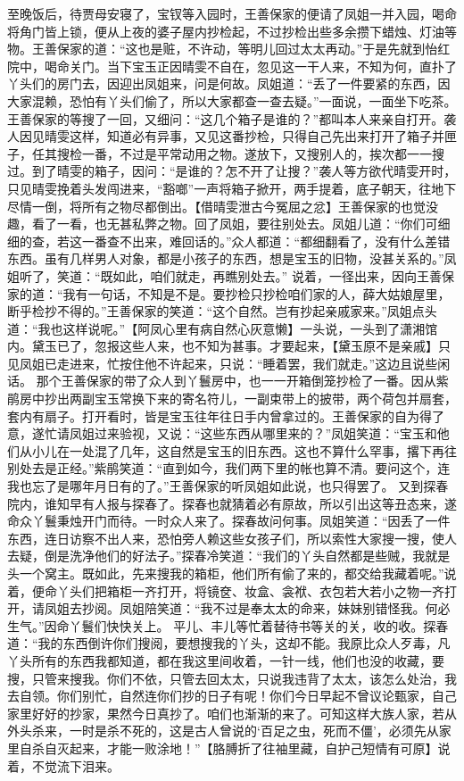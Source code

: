 \documentclass[12pt,oneside]{book}
\begin{document}
至晚饭后，待贾母安寝了，宝钗等入园时，王善保家的便请了凤姐一并入园，喝命将角门皆上锁，便从上夜的婆子屋内抄检起，不过抄检出些多余攒下蜡烛、灯油等物。王善保家的道：“这也是赃，不许动，等明儿回过太太再动。”于是先就到怡红院中，喝命关门。当下宝玉正因晴雯不自在，忽见这一干人来，不知为何，直扑了丫头们的房门去，因迎出凤姐来，问是何故。凤姐道：“丢了一件要紧的东西，因大家混赖，恐怕有丫头们偷了，所以大家都查一查去疑。”一面说，一面坐下吃茶。
王善保家的等搜了一回，又细问：“这几个箱子是谁的？”都叫本人来亲自打开。袭人因见晴雯这样，知道必有异事，又见这番抄检，只得自己先出来打开了箱子并匣子，任其搜检一番，不过是平常动用之物。遂放下，又搜别人的，挨次都一一搜过。到了晴雯的箱子，因问：“是谁的？怎不开了让搜？”袭人等方欲代晴雯开时，只见晴雯挽着头发闯进来，“豁啷”一声将箱子掀开，两手提着，底子朝天，往地下尽情一倒，将所有之物尽都倒出。【借晴雯泄古今冤屈之忿】王善保家的也觉没趣，看了一看，也无甚私弊之物。回了凤姐，要往别处去。凤姐儿道：“你们可细细的查，若这一番查不出来，难回话的。”众人都道：“都细翻看了，没有什么差错东西。虽有几样男人对象，都是小孩子的东西，想是宝玉的旧物，没甚关系的。”凤姐听了，笑道：“既如此，咱们就走，再瞧别处去。”
说着，一径出来，因向王善保家的道：“我有一句话，不知是不是。要抄检只抄检咱们家的人，薛大姑娘屋里，断乎检抄不得的。”王善保家的笑道：“这个自然。岂有抄起亲戚家来。”凤姐点头道：“我也这样说呢。”【阿凤心里有病自然心灰意懒】一头说，一头到了潇湘馆内。黛玉已了，忽报这些人来，也不知为甚事。才要起来，【黛玉原不是亲戚】只见凤姐已走进来，忙按住他不许起来，只说：“睡着罢，我们就走。”这边且说些闲话。
那个王善保家的带了众人到丫鬟房中，也一一开箱倒笼抄检了一番。因从紫鹃房中抄出两副宝玉常换下来的寄名符儿，一副束带上的披带，两个荷包并扇套，套内有扇子。打开看时，皆是宝玉往年往日手内曾拿过的。王善保家的自为得了意，遂忙请凤姐过来验视，又说：“这些东西从哪里来的？”凤姐笑道：“宝玉和他们从小儿在一处混了几年，这自然是宝玉的旧东西。这也不算什么罕事，撂下再往别处去是正经。”紫鹃笑道：“直到如今，我们两下里的帐也算不清。要问这个，连我也忘了是哪年月日有的了。”王善保家的听凤姐如此说，也只得罢了。
又到探春院内，谁知早有人报与探春了。探春也就猜着必有原故，所以引出这等丑态来，遂命众丫鬟秉烛开门而待。一时众人来了。探春故问何事。凤姐笑道：“因丢了一件东西，连日访察不出人来，恐怕旁人赖这些女孩子们，所以索性大家搜一搜，使人去疑，倒是洗净他们的好法子。”探春冷笑道：“我们的丫头自然都是些贼，我就是头一个窝主。既如此，先来搜我的箱柜，他们所有偷了来的，都交给我藏着呢。”说着，便命丫头们把箱柜一齐打开，将镜奁、妆盒、衾袱、衣包若大若小之物一齐打开，请凤姐去抄阅。凤姐陪笑道：“我不过是奉太太的命来，妹妹别错怪我。何必生气。”因命丫鬟们快快关上。
平儿、丰儿等忙着替待书等关的关，收的收。探春道：“我的东西倒许你们搜阅，要想搜我的丫头，这却不能。我原比众人歹毒，凡丫头所有的东西我都知道，都在我这里间收着，一针一线，他们也没的收藏，要搜，只管来搜我。你们不依，只管去回太太，只说我违背了太太，该怎么处治，我去自领。你们别忙，自然连你们抄的日子有呢！你们今日早起不曾议论甄家，自己家里好好的抄家，果然今日真抄了。咱们也渐渐的来了。可知这样大族人家，若从外头杀来，一时是杀不死的，这是古人曾说的‘百足之虫，死而不僵’，必须先从家里自杀自灭起来，才能一败涂地！”【胳膊折了往袖里藏，自护己短情有可原】说着，不觉流下泪来。
\end{document}
